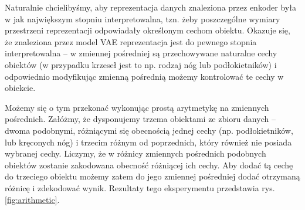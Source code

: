 \documentclass{iithesis}
\begin{document}
Naturalnie chcielibyśmy, aby reprezentacja danych znaleziona przez enkoder była w jak największym
stopniu interpretowalna, tzn. żeby poszczególne wymiary przestrzeni reprezentacji odpowiadały
określonym cechom obiektu. Okazuje się, że znaleziona przez model VAE reprezentacja jest
do pewnego stopnia interpretowalna -- w zmiennej pośredniej są przechowywane naturalne cechy
obiektów (w przypadku krzeseł jest to np. rodzaj nóg lub podłokietników) i odpowiednio modyfikując
zmienną pośrednią możemy kontrolować te cechy w obiekcie.

Możemy się o tym przekonać wykonując prostą arytmetykę na zmiennych pośrednich.
Załóżmy, że dysponujemy trzema obiektami ze zbioru danych -- dwoma podobnymi,
różniącymi się obecnością jednej cechy (np. podłokietników, lub kręconych nóg) i trzecim
różnym od poprzednich, który również nie posiada wybranej cechy.
Liczymy, że w różnicy zmiennych pośrednich podobnych obiektów zostanie zakodowana obecność
różniącej ich cechy. Aby dodać tą cechę do trzeciego obiektu możemy zatem do jego zmiennej pośredniej
dodać otrzymaną różnicę i zdekodować wynik. Rezultaty tego eksperymentu
przedstawia rys. \ref{fig:arithmetic}.

\end{document}
